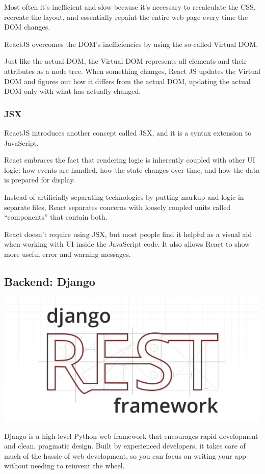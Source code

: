 \documentclass[a4paper]{article}
\numberwithin{equation}{section}
\begin{document}
Most often it's inefficient and slow because it's necessary to recalculate the CSS, recreate the layout, and essentially repaint the entire web page every time the DOM changes.

ReactJS overcomes the DOM's inefficiencies by using the so-called Virtual DOM\@.

Just like the actual DOM, the Virtual DOM represents all elements and their attributes as a node tree.
When something changes, React JS updates the Virtual DOM and figures out how it differs from the actual DOM, updating the actual DOM only with what has actually changed.

\subsubsection{JSX}
ReactJS introduces another concept called JSX, and it is a syntax extension to JavaScript.

React embraces the fact that rendering logic is inherently coupled with other UI logic: how events are handled, how the state changes over time, and how the data is prepared for display.

Instead of artificially separating technologies by putting markup and logic in separate files, React separates concerns with loosely coupled units called “components” that contain both.

React doesn't require using JSX, but most people find it helpful as a visual aid when working with UI inside the JavaScript code.
It also allows React to show more useful error and warning messages.

\subsection{Backend: Django}
\includegraphics[width=\textwidth]{assets/dj-logo.png}

Django is a high-level Python web framework that encourages rapid development and clean, pragmatic design.
Built by experienced developers, it takes care of much of the hassle of web development, so you can focus on writing your app without needing to reinvent the wheel.
\end{document}
